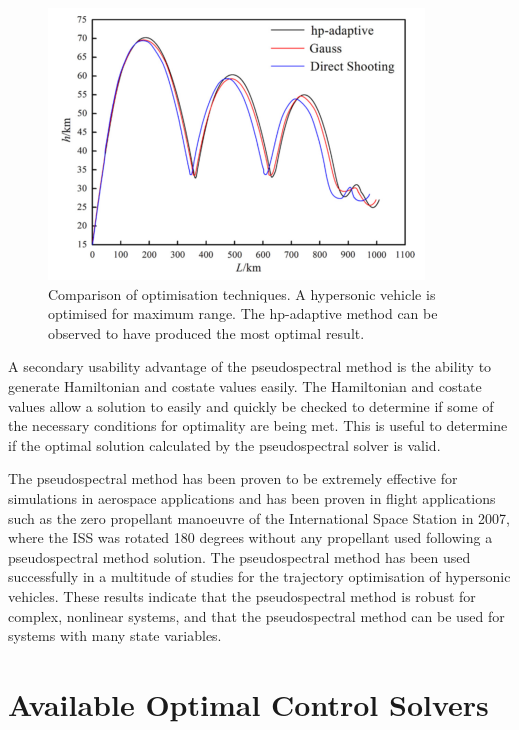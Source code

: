 \begin{figure}[ht]
	\centering
	\includegraphics[width=0.7\linewidth]{figures/2_literature-review/OptimisationMethodComparisonChai}
	\caption{Comparison of optimisation techniques\cite{Chai2015}. A hypersonic vehicle is optimised for maximum range. The hp-adaptive method can be observed to have produced the most optimal result.}
	\label{fig:OptimisationMethodComparisonChai}
\end{figure}

A secondary usability advantage of the pseudospectral method is the ability to generate Hamiltonian and costate values easily\cite{Gong2010,Fahroo2001,Rao2009}. The Hamiltonian and costate values allow a solution to easily and quickly be checked to determine if some of the necessary conditions for optimality are being met. This is useful to determine if the optimal solution calculated by the pseudospectral solver is valid.


The pseudospectral method has been proven to be extremely effective for simulations in aerospace applications and has been proven in flight applications such as the zero propellant manoeuvre of the International Space Station in 2007, where the ISS was rotated 180 degrees without any propellant used following a pseudospectral method solution\cite{Bedrossian}. 
The pseudospectral method has been used successfully in a multitude of studies for the trajectory optimisation of hypersonic vehicles\cite{Li2012,Josselyn2002a,Zhao2013,Tian2011,Darby2011,Chai2015,Rizvi2015,Moshman2014,Yang2017,Kodera2014}. 
These results indicate that the pseudospectral method is robust for complex, nonlinear systems, and that the pseudospectral method can be used for systems with many state variables.


\section{Available Optimal Control Solvers}\label{sec:optsolvers}

